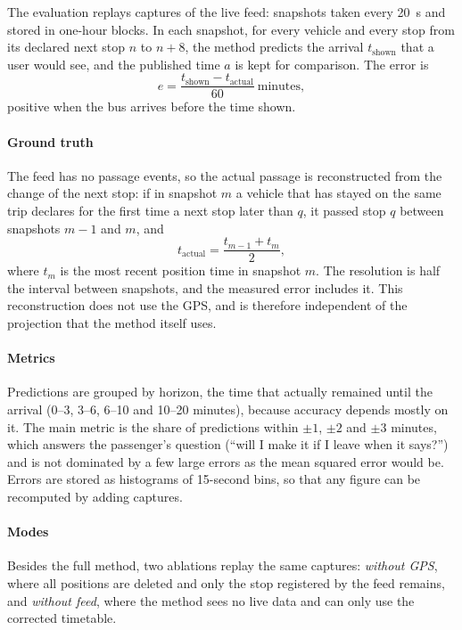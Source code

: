 \documentclass[preprint,11pt,nonatbib]{elsarticle}
\begin{document}
The evaluation replays captures of the live feed: snapshots taken every 20~s and stored in one-hour blocks. In each
snapshot, for every vehicle and every stop from its declared next stop $n$ to $n+8$, the method predicts the arrival
$t_{\mathrm{shown}}$ that a user would see, and the published time $a$ is kept for comparison. The error is
\begin{equation}
e=\frac{t_{\mathrm{shown}}-t_{\mathrm{actual}}}{60}\ \text{minutes},
\end{equation}
positive when the bus arrives before the time shown.

\paragraph{Ground truth} The feed has no passage events, so the actual passage is reconstructed from the change of the
next stop: if in snapshot $m$ a vehicle that has stayed on the same trip declares for the first time a next stop
later than $q$, it passed stop $q$ between snapshots $m-1$ and $m$, and
\begin{equation}
t_{\mathrm{actual}}=\frac{t_{m-1}+t_m}{2},
\end{equation}
where $t_m$ is the most recent position time in snapshot $m$. The resolution is half the interval between
snapshots, and the measured error includes it. This reconstruction does not use the GPS, and is therefore independent
of the projection that the method itself uses.

\paragraph{Metrics} Predictions are grouped by horizon, the time that actually remained until the arrival (0--3,
3--6, 6--10 and 10--20 minutes), because accuracy depends mostly on it. The main metric is the share of predictions
within $\pm1$, $\pm2$ and $\pm3$ minutes, which answers the passenger's question (``will I make it if I leave when it
says?'') and is not dominated by a few large errors as the mean squared error would be. Errors are stored as
histograms of 15-second bins, so that any figure can be recomputed by adding captures.

\paragraph{Modes} Besides the full method, two ablations replay the same captures: \emph{without GPS}, where all
positions are deleted and only the stop registered by the feed remains, and \emph{without feed}, where the method
sees no live data and can only use the corrected timetable.
\end{document}
